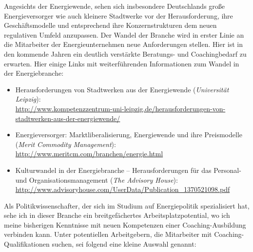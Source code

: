 \documentclass[11pt,a4paper]{article}
\begin{document}
\vspace{2cm}

Angesichts der Energiewende, sehen sich insbesondere Deutschlands große Energieversorger wie auch kleinere Stadtwerke vor der Herausforderung, ihre Geschäftsmodelle und entsprechend ihre Konzernstrukturen dem neuen regulativen Umfeld anzupassen. Der Wandel der Branche wird in erster Linie an die Mitarbeiter der Energieunternehmen neue Anforderungen stellen. Hier ist in den kommende Jahren ein deutlich verstärkte Beratungs- und Coachingbedarf zu erwarten. Hier einige Links mit weiterführenden Informationen zum Wandel in der Energiebranche:

	\begin{itemize}
	\item Herausforderungen von Stadtwerken aus der Energiewende (\textsl{Universität Leipzig}):\\
	\textsf{\textcolor{MidnightBlue}{\url{http://www.kompetenzzentrum-uni-leipzig.de/herausforderungen-von-stadtwerken-aus-der-energiewende/}}}

	\item Energieversorger: Marktliberalisierung, Energiewende und ihre Preismodelle (\textsl{Merit Commodity Management}):\\
	\textsf{\textcolor{MidnightBlue}{\url{http://www.meritcm.com/branchen/energie.html}}}

	\item Kulturwandel in der Energiebranche -- Herausforderungen für das Personal- und Organisationsmanagement (\textsl{The Advisory House}):\\
	\textsf{\textcolor{MidnightBlue}{\url{http://www.advisoryhouse.com/UserData/Publication_1370521098.pdf}}}
	\end{itemize}
	
Als Politikwissenschafter, der sich im Studium auf Energiepolitik spezialisiert hat, sehe ich in dieser Branche ein breitgefächertes Arbeitsplatzpotential, wo ich meine bisherigen Kenntnisse mit neuen Kompetenzen einer Coaching-Ausbildung verbinden kann. Unter potentiellen Arbeitgebern, die Mitarbeiter mit Coaching-Qualifikationen suchen, sei folgend eine kleine Auswahl genannt:
\end{document}
